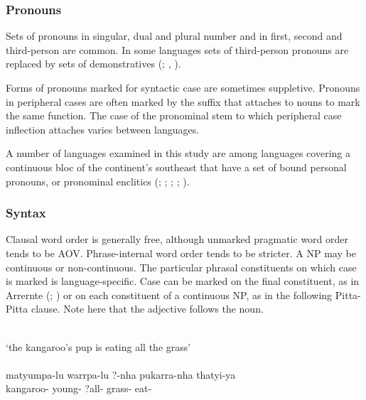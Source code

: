 \subsubsection{Pronouns}
\label{sec:key:1.2.2.3}

Sets of pronouns in singular, dual and plural number and in first, second and third-person are common. In some languages sets of third-person pronouns are replaced by sets of demonstratives (\citealt[5]{ray_aboriginal_1925}; \citealt[276--277]{dixon_languages_1980}, \citeyear[243]{dixon_australian_2002}).

Forms of pronouns marked for syntactic case are sometimes suppletive. Pronouns in peripheral cases are often marked by the suffix that attaches to nouns to mark the same function. The case of the pronominal stem to which peripheral case inflection attaches varies between languages. 

A number of languages examined in this study are among languages covering a continuous bloc of the continent’s southeast that have a set of bound personal pronouns, or pronominal enclitics (\citealt[337--401]{dixon_australian_2002}; ; ; ; ).

\subsubsection{Syntax}
\label{sec:key:1.2.2.4}

Clausal word order is generally free, although unmarked pragmatic word order tends to be AOV. Phrase-internal word order tends to be stricter. A NP may be continuous or non-continuous. The particular phrasal constituents on which case is marked is language-specific. Case can be marked on the final constituent, as in Arrernte (\citealt[102]{wilkins_mparntwe_1989}; \citealt[14]{henderson_topics_2013}) or on each constituent of a continuous NP, as in the following Pitta-Pitta clause. Note here that the adjective follows the noun. 

\ea
{} \\
 {`the kangaroo’s pup is eating all the grass'} \\
\glt \citep[12]{roth_ethnological_1897}\\
\gll matyumpa-lu warrpa-lu ?-nha pukarra-nha thatyi-ya \\
kangaroo- young- ?all- grass- eat-\\
\z

